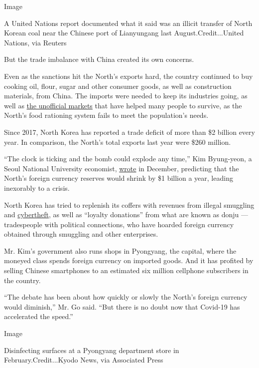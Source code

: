 Image

A United Nations report documented what it said was an illicit transfer
of North Korean coal near the Chinese port of Lianyungang last
August.Credit...United Nations, via Reuters

But the trade imbalance with China created its own concerns.

Even as the sanctions hit the North's exports hard, the country
continued to buy cooking oil, flour, sugar and other consumer goods, as
well as construction materials, from China. The imports were needed to
keep its industries going, as well as
\href{https://www.nytimes3xbfgragh.onion/2017/04/30/world/asia/north-korea-economy-marketplace.html}{the
unofficial markets} that have helped many people to survive, as the
North's food rationing system fails to meet the population's needs.

Since 2017, North Korea has reported a trade deficit of more than \$2
billion every year. In comparison, the North's total exports last year
were \$260 million.​

``The clock is ticking and the bomb could explode any time,'' Kim
Byung-yeon, a​ Seoul National University​ economist​,
\href{https://koreajoongangdaily.joins.com/2019/12/18/columns/Kim-in-a-cage/3071650.html?detailWord=}{wrote}
in December, predicting that the North's foreign currency reserves would
shrink by \$1 billion a year, leading inexorably to a crisis.

North Korea has tried to replenish its coffers with revenues from
illegal smuggling and
\href{https://www.reuters.com/article/us-northkorea-cyber-un/north-korea-took-2-billion-in-cyberattacks-to-fund-weapons-program-u-n-report-idUSKCN1UV1ZX}{cybertheft,}
as well as ``loyalty donations'' from ​what are known as donju ---
tradespeople with political connections, who have hoarded foreign
currency obtained through smuggling​ and other enterprises.

Mr. Kim's government also runs shops in Pyongyang, the capital, where
the moneyed class spends foreign currency on imported goods. And it has
profited by selling Chinese smartphones to an estimated six million
cellphone subscribers in the country.

``The debate has been about how quickly or slowly the North's foreign
currency would diminish,'' Mr. Go said. ``But there is no doubt now that
Covid-19 has accelerated the speed.''

Image

Disinfecting surfaces at a Pyongyang department store in
February.Credit...Kyodo News, via Associated Press

